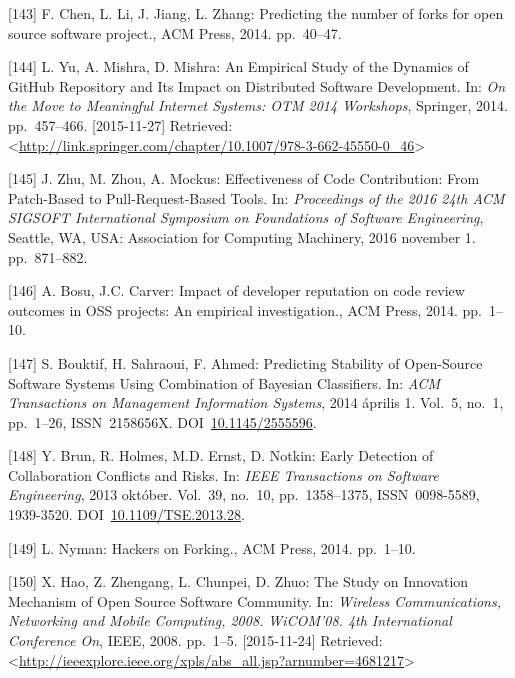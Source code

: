 \documentclass[12pt,magyar,a4paper,oneside]{scrreprt}
\newenvironment{cslreferences}%
  {}%
  {\par}
\begin{document}
\begin{cslreferences}
\leavevmode\hypertarget{ref-chen_predicting_2014}{}%
{[}143{]} F. Chen, L. Li, J. Jiang, L. Zhang: Predicting the number of
forks for open source software project., ACM Press, 2014. pp.~40--47.

\leavevmode\hypertarget{ref-yu_empirical_2014}{}%
{[}144{]} L. Yu, A. Mishra, D. Mishra: An Empirical Study of the
Dynamics of GitHub Repository and Its Impact on Distributed Software
Development. In: \emph{On the Move to Meaningful Internet Systems: OTM
2014 Workshops}, Springer, 2014. pp.~457--466. {[}2015-11-27{]}
Retrieved:
\textless{}\url{http://link.springer.com/chapter/10.1007/978-3-662-45550-0_46}\textgreater{}

\leavevmode\hypertarget{ref-zhu_effectiveness_2016}{}%
{[}145{]} J. Zhu, M. Zhou, A. Mockus: Effectiveness of Code
Contribution: From Patch-Based to Pull-Request-Based Tools. In:
\emph{Proceedings of the 2016 24th ACM SIGSOFT International Symposium
on Foundations of Software Engineering}, Seattle, WA, USA: Association
for Computing Machinery, 2016 november 1. pp.~871--882.

\leavevmode\hypertarget{ref-bosu_impact_2014}{}%
{[}146{]} A. Bosu, J.C. Carver: Impact of developer reputation on code
review outcomes in OSS projects: An empirical investigation., ACM Press,
2014. pp.~1--10.

\leavevmode\hypertarget{ref-bouktif_predicting_2014}{}%
{[}147{]} S. Bouktif, H. Sahraoui, F. Ahmed: Predicting Stability of
Open-Source Software Systems Using Combination of Bayesian Classifiers.
In: \emph{ACM Transactions on Management Information Systems}, 2014
április 1. Vol.~5, no.~1, pp.~1--26, ISSN~2158656X.
DOI~\href{https://doi.org/10.1145/2555596}{10.1145/2555596}.

\leavevmode\hypertarget{ref-brun_early_2013}{}%
{[}148{]} Y. Brun, R. Holmes, M.D. Ernst, D. Notkin: Early Detection of
Collaboration Conflicts and Risks. In: \emph{IEEE Transactions on
Software Engineering}, 2013 október. Vol.~39, no.~10, pp.~1358--1375,
ISSN~0098-5589, 1939-3520.
DOI~\href{https://doi.org/10.1109/TSE.2013.28}{10.1109/TSE.2013.28}.

\leavevmode\hypertarget{ref-nyman_hackers_2014}{}%
{[}149{]} L. Nyman: Hackers on Forking., ACM Press, 2014. pp.~1--10.

\leavevmode\hypertarget{ref-hao_study_2008}{}%
{[}150{]} X. Hao, Z. Zhengang, L. Chunpei, D. Zhuo: The Study on
Innovation Mechanism of Open Source Software Community. In:
\emph{Wireless Communications, Networking and Mobile Computing, 2008.
WiCOM'08. 4th International Conference On}, IEEE, 2008. pp.~1--5.
{[}2015-11-24{]} Retrieved:
\textless{}\url{http://ieeexplore.ieee.org/xpls/abs_all.jsp?arnumber=4681217}\textgreater{}


\end{cslreferences}
\end{document}
